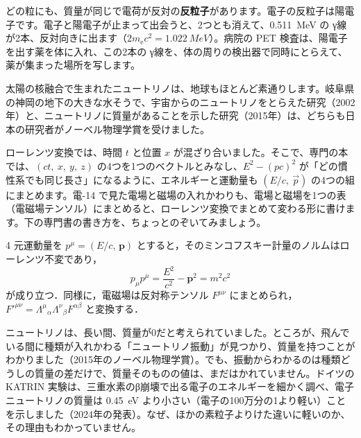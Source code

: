 どの粒にも、質量が同じで電荷が反対の\textbf{反粒子}があります。電子の反粒子は陽電子です。電子と陽電子が止まって出会うと、2つとも消えて、\qty{0.511}{MeV} の γ線が2本、反対向きに出ます（$2m_{\mathrm e}c^2=\qty{1.022}{MeV}$）。病院の PET 検査は、陽電子を出す薬を体に入れ、この2本の γ線を、体の周りの検出器で同時にとらえて、薬が集まった場所を写します。

太陽の核融合で生まれたニュートリノは、地球もほとんど素通りします。岐阜県の神岡の地下の大きな水そうで、宇宙からのニュートリノをとらえた研究（2002年）と、ニュートリノに質量があることを示した研究（2015年）は、どちらも日本の研究者がノーベル物理学賞を受けました。

\label{ph:原-11:sec12}
ローレンツ変換では、時間 $t$ と位置 $x$ が混ざり合いました。そこで、専門の本では、$(ct,\ x,\ y,\ z)$ の4つを1つのベクトルとみなし、$E^2-(pc)^2$ が「どの慣性系でも同じ長さ」になるように、エネルギーと運動量も $(E/c,\ \vec p)$ の4つの組にまとめます。電-14 で見た電場と磁場の入れかわりも、電場と磁場を1つの表（電磁場テンソル）にまとめると、ローレンツ変換でまとめて変わる形に書けます。下の専門書の書き方を、ちょっとのぞいてみましょう。

\begin{senmonsho}[相対論の専門書の書き方]
\begin{bkhonbun}
4 元運動量を $p^\mu=(E/c,\,\boldsymbol p)$ とすると，そのミンコフスキー計量のノルムはローレンツ不変であり，
\[ p_\mu p^\mu=\frac{E^2}{c^2}-\boldsymbol p^2=m^2c^2 \]
が成り立つ．同様に，電磁場は反対称テンソル $F^{\mu\nu}$ にまとめられ，$F'^{\mu\nu}=\Lambda^\mu{}_\alpha\Lambda^\nu{}_\beta F^{\alpha\beta}$ と変換する．
\end{bkhonbun}
\end{senmonsho}

\begin{phmada}
ニュートリノは、長い間、質量が0だと考えられていました。ところが、飛んでいる間に種類が入れかわる「ニュートリノ振動」が見つかり、質量を持つことがわかりました（2015年のノーベル物理学賞）。でも、振動からわかるのは種類どうしの質量の差だけで、質量そのものの値は、まだはかれていません。ドイツの KATRIN 実験は、三重水素のβ崩壊で出る電子のエネルギーを細かく調べ、電子ニュートリノの質量は \qty{0.45}{eV} より小さい（電子の100万分の1より軽い）ことを示しました（2024年の発表）。なぜ、ほかの素粒子よりけた違いに軽いのか、その理由もわかっていません。
\end{phmada}

